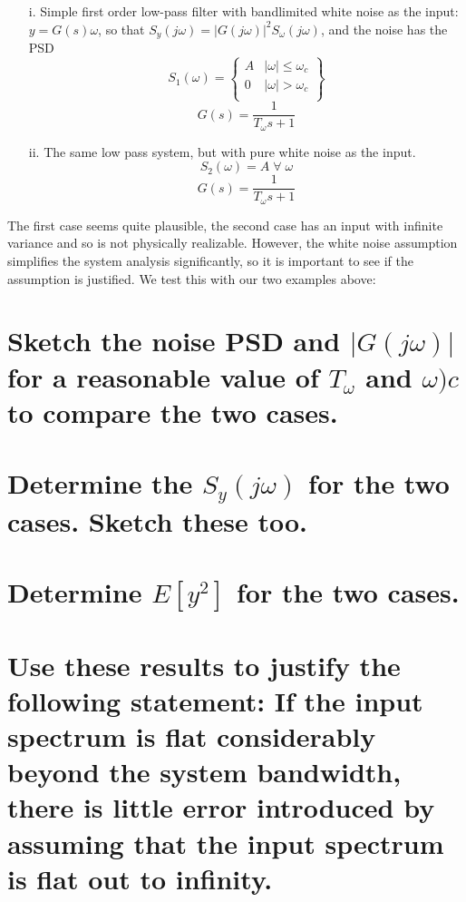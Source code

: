 \documentclass[12pt,letterpaper, onecolumn]{exam}
\begin{document}
\begin{questions}
\begin{parts}
        \solution{}
    \end{parts}
    \clearpage
    \begin{itemize}
        \item[i.]{Simple first order low-pass filter with bandlimited white noise as the input:
        $y = G(s)\omega$, so that $S_y(j\omega) = \left\vert G(j\omega) \right\vert^2S_{\omega}(j\omega)$, and the noise has the PSD
        \[S_1(\omega) =
            \begin{Bmatrix}
                A & \vert \omega \vert \leq \omega_c \\
                0 & \vert \omega \vert > \omega_c    \\
            \end{Bmatrix} \]
        \[G(s) = \frac{1}{T_{\omega}s + 1} \]
        }
        \item[ii.]{The same low pass system, but with pure white noise as the input.
                    \[S_2(\omega) = A\;\forall\;\omega   \]
                    \[G(s) = \frac{1}{T_{\omega}s + 1} \]
              }
    \end{itemize}
    The first case seems quite plausible, the second case has an input with infinite variance and so is not physically realizable. However, the white noise assumption simplifies the system analysis significantly, so it is important to see if the assumption is justified. We test this with our two examples above:
    \begin{parts}
        \part{Sketch the noise PSD and $\vert G(j\omega)\vert$ for a reasonable value of $T_\omega$ and $\omega)c$ to compare the two cases.}

        \solution{}

        \part{Determine the $S_y(j\omega)$ for the two cases. Sketch these too.}

        \solution{}

        \part{Determine $E[y^2]$ for the two cases.}

        \solution{}

        \part{Use these results to justify the following statement:
            If the input spectrum is flat considerably beyond the system bandwidth, there is little error introduced by assuming that the input spectrum is flat out to infinity.
        }

        \solution{}

    \end{parts}

\end{questions}
\end{document}
